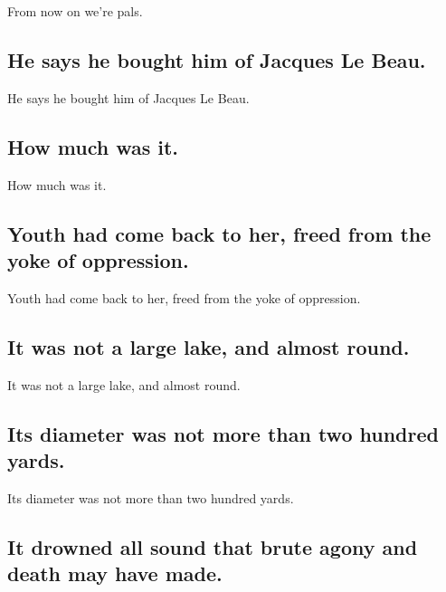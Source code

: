 \documentclass[]{article}
\begin{document}
From now on we're pals.

\hypertarget{he-says-he-bought-him-of-jacques-le-beau.}{%
\subsection{He says he bought him of Jacques Le
Beau.}\label{he-says-he-bought-him-of-jacques-le-beau.}}

He says he bought him of Jacques Le Beau.

\hypertarget{how-much-was-it.}{%
\subsection{How much was it.}\label{how-much-was-it.}}

How much was it.

\hypertarget{youth-had-come-back-to-her-freed-from-the-yoke-of-oppression.}{%
\subsection{Youth had come back to her, freed from the yoke of
oppression.}\label{youth-had-come-back-to-her-freed-from-the-yoke-of-oppression.}}

Youth had come back to her, freed from the yoke of oppression.

\hypertarget{it-was-not-a-large-lake-and-almost-round.}{%
\subsection{It was not a large lake, and almost
round.}\label{it-was-not-a-large-lake-and-almost-round.}}

It was not a large lake, and almost round.

\hypertarget{its-diameter-was-not-more-than-two-hundred-yards.}{%
\subsection{Its diameter was not more than two hundred
yards.}\label{its-diameter-was-not-more-than-two-hundred-yards.}}

Its diameter was not more than two hundred yards.

\hypertarget{it-drowned-all-sound-that-brute-agony-and-death-may-have-made.}{%
\subsection{It drowned all sound that brute agony and death may have
made.}\label{it-drowned-all-sound-that-brute-agony-and-death-may-have-made.}}
\end{document}
